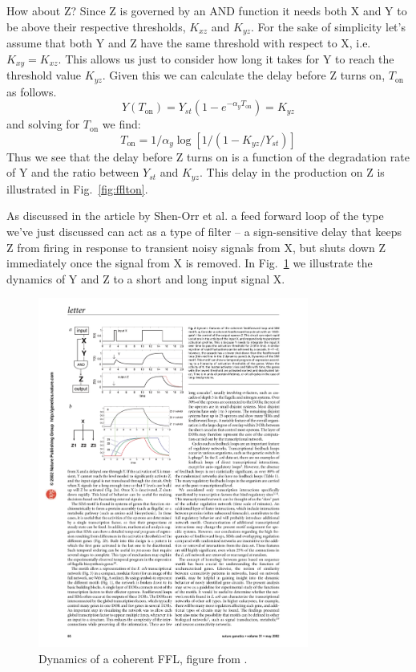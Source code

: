 \documentclass[11pt,letterpaper,oneside,pagesize]{scrartcl}
\begin{document}
How about Z? Since Z is governed by an AND function it needs both X and Y to be above their respective thresholds, $K_{xz}$ and $K_{yz}$. For the sake of simplicity let's assume that both Y and Z have the same threshold with respect to X, i.e. $K_{xy} = K_{xz}$. This allows us just to consider how long it takes for Y to reach the threshold value $K_{yz}$. Given this we can calculate the delay before Z turns on, $T_{\mathrm{on}}$ as follows.
%
\[
Y(T_{\mathrm{on}}) = Y_{st}(1-e^{-\alpha_y T_{\mathrm{on}}}) = K_{yz}
\]
and solving for $T_{\mathrm{on}}$ we find:
\[
T_{\mathrm{on}} = 1/\alpha_y \log[1/(1-K_{yz}/Y_{st})]
\]
%
Thus we see that the delay before Z turns on is a function of the degradation rate of Y and the ratio between $Y_{st}$ and $K_{yz}$.  This delay in the production on Z is illustrated in Fig.~\ref{fig:fflton}.


As discussed in the article by Shen-Orr et al. \cite{Shen-Orr2002} a feed forward loop of the type we've just discussed can act as a type of filter -- a sign-sensitive delay that keeps Z from firing in response to transient noisy signals from X, but shuts down Z immediately once the signal from X is removed. In Fig.~\ref{fig:fflcoh} we illustrate the dynamics of Y and Z to a short and long input signal X.

\begin{figure}[lht]
\centering
 \includegraphics[width=3.5in]{ffl-coherent.pdf}
\caption{Dynamics of a coherent FFL, figure from \cite{Shen-Orr2002}.}
\label{fig:fflcoh}
\end{figure}
\end{document}
